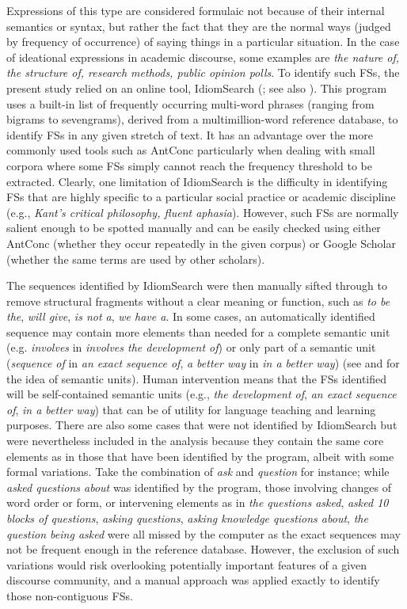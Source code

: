 \documentclass[output=paper]{langsci/langscibook}
\begin{document}
Expressions of this type are considered formulaic not because of their internal semantics or syntax, but rather the fact that they are the normal ways (judged by frequency of occurrence) of saying things in a particular situation. In the case of ideational expressions in academic discourse, some examples are \textit{the nature of, the structure of, research methods, public opinion polls}. To identify such FSs, the present study relied on an online tool, IdiomSearch (\citealt{Colson2016a}; see also \citealt{Colson2016b}). This program uses a built-in list of frequently occurring multi-word phrases (ranging from bigrams to sevengrams), derived from a multimillion-word reference database, to identify FSs in any given stretch of text. It has an advantage over the more commonly used tools such as AntConc particularly when dealing with small corpora where some FSs simply cannot reach the frequency threshold to be extracted. Clearly, one limitation of IdiomSearch is the difficulty in identifying FSs that are highly specific to a particular social practice or academic discipline (e.g., \textit{Kant’s critical philosophy, fluent aphasia}). However, such FSs are normally salient enough to be spotted manually and can be easily checked using either AntConc (whether they occur repeatedly in the given corpus) or Google Scholar (whether the same terms are used by other scholars).

The sequences identified by IdiomSearch were then manually sifted through to remove structural fragments without a clear meaning or function, such as \textit{to be the}, \textit{will give}, \textit{is not a}, \textit{we have a}. In some cases, an automatically identified sequence may contain more elements than needed for a complete semantic unit (e.g. \textit{involves} in \textit{involves the development of}) or only part of a semantic unit (\textit{sequence of} in \textit{an exact sequence of}, \textit{a better way} in \textit{in a better way}) (see \citealt{MartinezSchmitt2012} and \citealt{Buerki2016} for the idea of semantic units). Human intervention means that the FSs identified will be self-contained semantic units (e.g., \textit{the development of}, \textit{an exact sequence of}, \textit{in a better way}) that can be of utility for language teaching and learning purposes. There are also some cases that were not identified by IdiomSearch but were nevertheless included in the analysis because they contain the same core elements as in those that have been identified by the program, albeit with some formal variations. Take the combination of \textit{ask} and \textit{question} for instance; while \textit{asked questions about} was identified by the program, those involving changes of word order or form, or intervening elements as in \textit{the questions asked}, \textit{asked 10 blocks of questions}, \textit{asking questions}, \textit{asking knowledge questions about}, \textit{the question being asked} were all missed by the computer as the exact sequences may not be frequent enough in the reference database. However, the exclusion of such variations would risk overlooking potentially important features of a given discourse community, and a manual approach was applied exactly to identify those non-contiguous FSs.
\end{document}
